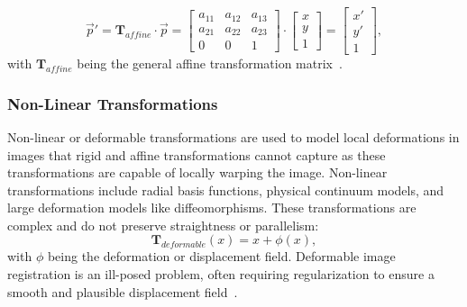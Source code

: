 \begin{equation}
	\overrightarrow{p}' = \mathbf{T}_{affine} \cdot  \overrightarrow{p} = 
	\begin{bmatrix}
		a_{11} & a_{12} & a_{13}\\
		a_{21} & a_{22} & a_{23}\\
		0 & 0 & 1
	\end{bmatrix}
	\cdot
	\begin{bmatrix}
		x\\
		y\\
		1
	\end{bmatrix}
	 = 
	 \begin{bmatrix}
		x'\\
		y'\\
		1
	\end{bmatrix},
\end{equation}
with $\mathbf{T}_{affine}$ being the general affine transformation matrix~\cite{Strittmatter2023}.

\subsubsection{Non-Linear Transformations}
Non-linear or deformable transformations are used to model local deformations in images that rigid and affine transformations cannot capture as these transformations are capable of locally warping the image. Non-linear transformations include radial basis functions, physical continuum models, and large deformation models like diffeomorphisms. These transformations are complex and do not preserve straightness or parallelism:
\begin{equation}
	\mathbf{T}_{deformable} (x) = x + \phi (x),
\end{equation}
with $\phi$ being the deformation or displacement field. Deformable image registration is an ill-posed problem, often requiring regularization to ensure a smooth and plausible displacement field~\cite{Strittmatter2023}.

